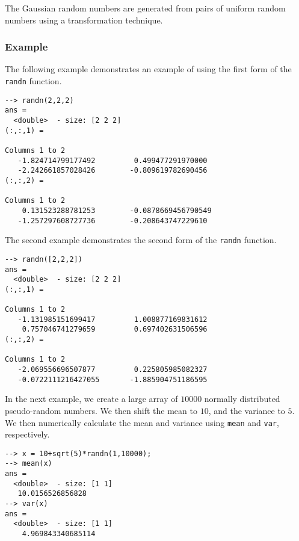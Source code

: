 
The Gaussian random numbers are generated from pairs of uniform random numbers using a transformation technique. 
\subsubsection{Example}
The following example demonstrates an example of using the first form of the \verb|randn| function.
\begin{verbatim}
--> randn(2,2,2)
ans =
  <double>  - size: [2 2 2]
(:,:,1) =
  
Columns 1 to 2
   -1.824714799177492         0.499477291970000
   -2.242661857028426        -0.809619782690456
(:,:,2) =
  
Columns 1 to 2
    0.131523288781253        -0.0878669456790549
   -1.257297608727736        -0.208643747229610
\end{verbatim}
The second example demonstrates the second form of the \verb|randn| function.
\begin{verbatim}
--> randn([2,2,2])
ans =
  <double>  - size: [2 2 2]
(:,:,1) =
  
Columns 1 to 2
   -1.131985151699417         1.008877169831612
    0.757046741279659         0.697402631506596
(:,:,2) =
  
Columns 1 to 2
   -2.069556696507877         0.225805985082327
   -0.0722111216427055       -1.885904751186595
\end{verbatim}
In the next example, we create a large array of $10000$  normally distributed pseudo-random numbers.  We then shift the mean to $10$, and the variance to $5$.  We then numerically calculate the mean and variance using \verb|mean| and \verb|var|, respectively.
\begin{verbatim}
--> x = 10+sqrt(5)*randn(1,10000);
--> mean(x)
ans =
  <double>  - size: [1 1]
   10.0156526856828
--> var(x)
ans =
  <double>  - size: [1 1]
    4.969843340685114
\end{verbatim}
